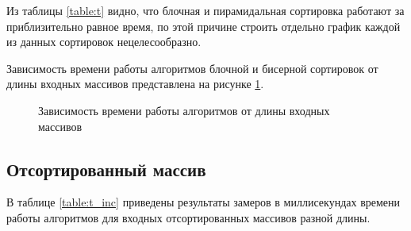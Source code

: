 \documentclass[a4paper,14pt, unknownkeysallowed]{extreport}
\begin{document}
Из таблицы \ref{table:t} видно, что блочная и пирамидальная сортировка работают за приблизительно равное время, по этой причине строить отдельно график каждой из данных сортировок нецелесообразно.

Зависимость времени работы алгоритмов блочной и бисерной сортировок от длины входных массивов представлена на рисунке \ref{ris}.

\begin{center}
	\begin{figure}[h!]
	\center
	\caption{Зависимость времени работы алгоритмов от длины входных массивов}
	\label{ris}
	\end{figure}
\end{center}

\subsection{Отсортированный массив}
	
В таблице \ref{table:t_inc} приведены результаты замеров в миллисекундах времени работы алгоритмов для входных отсортированных массивов разной длины.

\clearpage
\end{document}
